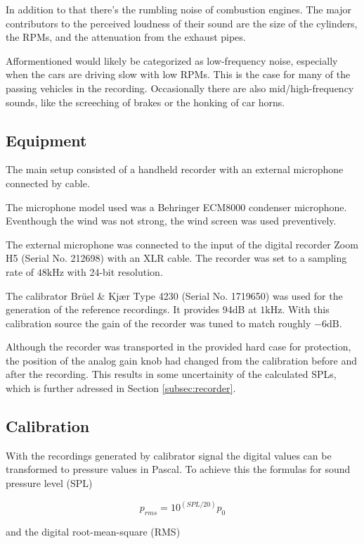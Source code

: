 \documentclass[twocolumn]{article}
\begin{document}
In addition to that there's the rumbling noise of combustion engines.
The major contributors to the perceived loudness of their sound are the size of the cylinders, the RPMs, and
the attenuation from the exhaust pipes.

Afformentioned would likely be categorized as low-frequency noise, especially when the cars are driving slow
with low RPMs.
This is the case for many of the passing vehicles in the recording.
Occasionally there are also mid/high-frequency sounds, like the screeching of brakes or the honking of car horns.

\subsection{Equipment}
The main setup consisted of a handheld recorder with an external microphone connected by cable.

The microphone model used was a Behringer ECM8000 condenser microphone.
Eventhough the wind was not strong, the wind screen was used preventively.

The external microphone was connected to the input of the digital recorder Zoom H5 (Serial No. 212698) with
an XLR cable.
The recorder was set to a sampling rate of $48\textrm{kHz}$ with 24-bit resolution.

The calibrator Brüel \& Kjær Type 4230 (Serial No. 1719650) was used for the generation of the
reference recordings.
It provides 94dB at $1\textrm{kHz}$.
With this calibration source the gain of the recorder was tuned to match roughly $-6\textrm{dB}$.

Although the recorder was transported in the provided hard case for protection, the position of the analog gain
knob had changed from the calibration before and after the recording.
This results in some uncertainity of the calculated SPLs, which is further adressed in Section 
\ref{subsec:recorder}.

\subsection{Calibration}
With the recordings generated by calibrator signal the digital values can be transformed to pressure
values in Pascal.
To achieve this the formulas for sound pressure level (SPL)

\begin{equation}
    p_{rms} = 10^{\left(SPL/20\right)}p_{0}
\end{equation}

and the digital root-mean-square (RMS)
\end{document}
